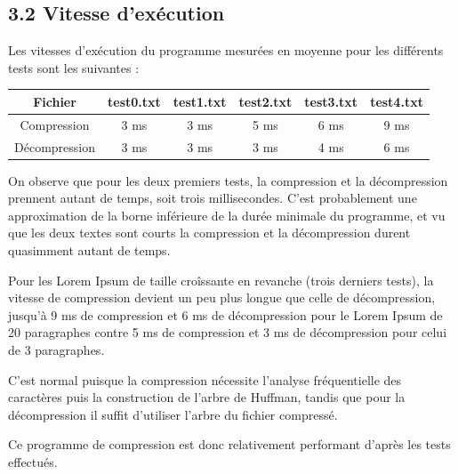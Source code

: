 \documentclass [a4paper,11pt] {report}
\begin{document}
\subsection* {3.2\hspace{3mm} Vitesse d'exécution}

Les vitesses d'exécution du programme mesurées en moyenne pour les différents tests sont les suivantes :
\begin{center}
\begin{tabular}{|c|c|c|c|c|c|}
 \hline
Fichier & test0.txt & test1.txt & test2.txt & test3.txt & test4.txt\\
 \hline
Compression & 3 ms & 3 ms & 5 ms & 6 ms & 9 ms\\
Décompression & 3 ms & 3 ms & 3 ms & 4 ms & 6 ms\\
 \hline
\end{tabular}
\end{center}
\vspace{0.25cm}

On observe que pour les deux premiers tests, la compression et la décompression prennent autant de temps, soit trois millisecondes. C'est probablement une approximation de la borne inférieure de la durée minimale du programme, et vu que les deux textes sont courts la compression et la décompression durent quasimment autant de temps.

Pour les Lorem Ipsum de taille croîssante en revanche (trois derniers tests), la vitesse de compression devient un peu plus longue que celle de décompression, jusqu'à 9 ms de compression et 6 ms de décompression pour le Lorem Ipsum de 20 paragraphes contre 5 ms de compression et 3 ms de décompression pour celui de 3 paragraphes.

C'est normal puisque la compression nécessite l'analyse fréquentielle des caractères puis la construction de l'arbre de Huffman, tandis que pour la décompression il suffit d'utiliser l'arbre du fichier compressé.

Ce programme de compression est donc relativement performant d'après les tests effectués.
\end{document}
